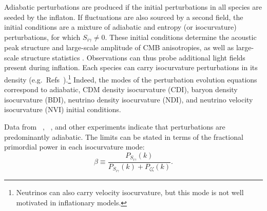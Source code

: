 Adiabatic perturbations are produced if the initial perturbations in all species are seeded by the inflaton. If fluctuations are also sourced by a second field, the initial conditions are a mixture of adiabatic and entropy (or isocurvature) perturbations, for which $S_{i\gamma}\neq 0$. These initial conditions determine the acoustic peak structure and large-scale amplitude of CMB anisotropies, as well as large-scale structure statistics \cite{Bond:1984fp,Kodama:1986fg,Kodama:1986ud,Hu:1994jd,Moodley:2004nz,Bean:2006qz}. Observations can thus probe additional light fields present during inflation. 
\label{sec:isosec}
Each species can carry isocurvature perturbations in its density (e.g.\ Refs~\cite{Bucher:1999re,Bucher:2004an,Moodley:2004nz}).\footnote{Neutrinos can also carry velocity isocurvature, but this mode is not well motivated in inflationary models.} Indeed, the modes of the perturbation evolution equations correspond to adiabatic, CDM density isocurvature (CDI), baryon density isocurvature (BDI), neutrino density isocurvature (NDI), and neutrino velocity isocurvature (NVI) initial conditions. 


Data from \wmap\ \cite{Dunkley:2008ie}, \planck\ \cite{Ade:2013uln,Ade:2015lrj}, and other experiments \cite{Enqvist:2000hp,MacTavish:2005yk} indicate that perturbations are predominantly adiabatic. The limits can be stated in terms of the fractional primordial power in each isocurvature mode:\begin{equation}
\beta\equiv \frac{P_{S_{i\gamma}}(k)}{P_{S_{i\gamma}}(k)+P_{\zeta\zeta}(k)}.
\end{equation}

